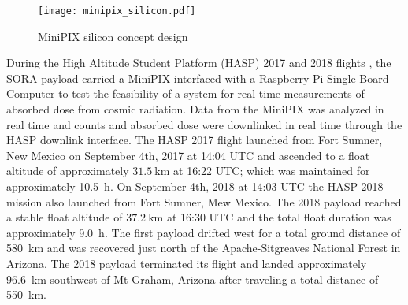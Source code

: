 \begin{figure}[H]
    \centering
    \texttt{[image: minipix\_silicon.pdf]}
    \caption{MiniPIX silicon concept design}
    \label{fig:minipix_silicon}
\end{figure}

During the High Altitude Student Platform (HASP) 2017 and 2018 flights \cite{hasp}, the SORA payload carried a MiniPIX interfaced with a Raspberry Pi Single Board Computer to test the feasibility of a system for real-time measurements of absorbed dose from cosmic radiation. Data from the MiniPIX was analyzed in real time and counts and absorbed dose were downlinked in real time through the HASP downlink interface. The HASP 2017 flight launched from Fort Sumner, New Mexico on September 4th, 2017 at 14:04 UTC and ascended to a float altitude of approximately $\SI{31.5}{\kilo\meter}$ at 16:22 UTC; which was maintained for approximately \SI{10.5}{\hour}. On September 4th, 2018 at 14:03 UTC the HASP 2018 mission also launched from Fort Sumner, Mew Mexico.  The 2018 payload reached a stable float altitude of $\SI{37.2}{\kilo\meter}$ at 16:30 UTC and the total float duration was approximately \SI{9.0}{\hour}. The first payload drifted west for a total ground distance of \SI{580}{\kilo\meter} and was recovered just north of the Apache-Sitgreaves National Forest in Arizona. The 2018 payload terminated its flight and landed approximately \SI{96.6}{\kilo\meter} southwest of Mt Graham, Arizona after traveling a total distance of \SI{550}{\kilo\meter}.
%
%
%
%
%
%
%
%
%

